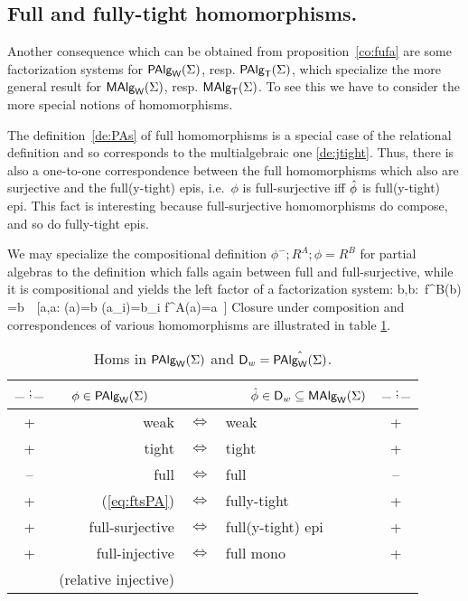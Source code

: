 \documentclass[10pt]{article}
\begin{document}
\subsection{Full and fully-tight homomorphisms.}\label{sub:fjt}

Another consequence which can be obtained from proposition~\ref{co:fufa}
are some factorization systems for $\mbox{\rm\sf PAlg}_{\sf W}(\Sigma)$, resp. $\mbox{\rm\sf PAlg}_{\sf T}(\Sigma)$, which
specialize the more general result for $\mbox{\rm\sf MAlg}_{\sf W}(\Sigma)$, resp. $\mbox{\rm\sf MAlg}_{\sf T}(\Sigma)$. To see
this we have to consider the more special notions of homomorphisms.

The definition~\ref{de:PAs} of full homomorphisms is a special case of the
relational definition and so corresponds to the multialgebraic one
\ref{de:jtight}.  Thus, there is also a one-to-one correspondence
between the full homomorphisms which also are surjective and the full(y-tight)
epis, i.e.\ $\phi$ is full-surjective iff $\hat{\phi}$ is full(y-tight)
epi.  This fact is interesting because full-surjective homomorphisms do
compose, and so do fully-tight epis.

We may specialize the compositional definition $\phi^-;R^A;\phi=R^B$
for partial algebras to the definition which falls again between full
and full-surjective, while it is compositional and yields the left
factor of a factorization system: 
\eq
{ \forall \lis b,b:\ f^B(\lis b) =b\ \Iff\ [\exists \lis a,a:
\phi(a)=b \land \phi(a_i)=b_i \land f^A(\lis a)=a\ ]
\label{eq:ftsPA}
}
Closure under composition and correspondences of various homomorphisms are
illustrated in table \ref{ta:homs}.

\begin{table}[hbt]
\begin{center}
\begin{tabular}{cr|c|lc}
$\Comp{\_\ }\_$ & $\phi\in\mbox{\rm\sf PAlg}_{\sf W}(\Sigma)$\ \ \  & 
 & \ \ \ $\hat{\phi}\in\mbox{\rm\sf D}_w\subseteq\mbox{\rm\sf MAlg}_{\sf W}(\Sigma)$ & $\Comp{\_\ }\_$ \\ \hline
+ & weak & $\iff$ & weak & + \\
+ & tight & $\iff$  & tight & +\\
-- & full & $\iff$ & full  & -- \\
+ & (\ref{eq:ftsPA}) & $\iff$ & fully-tight & + \\
+ & full-surjective & $\iff$ & full(y-tight) epi  & +\\
+& full-injective & $\iff$ & full  mono &  + \\
& (relative injective) 
\end{tabular}
\end{center}
\caption{Homs in $\mbox{\rm\sf PAlg}_{\sf W}(\Sigma)$ and $\mbox{\rm\sf D}_w=\hat{\mbox{\rm\sf PAlg}_{\sf W}(\Sigma)}$.}\label{ta:homs}
\end{table}
\end{document}
